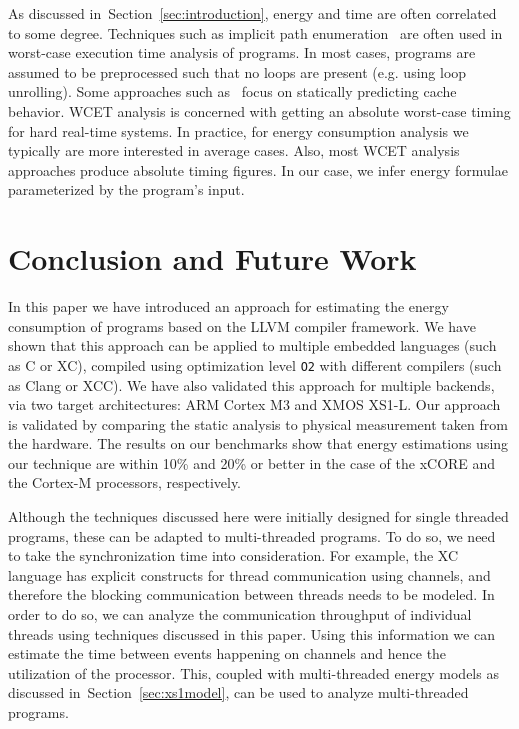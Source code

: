\documentclass[9pt,preprint]{sigplanconf}
\newcommand{\secref}[1]{Section~\ref{sec:#1}}
\begin{document}
As discussed in~\secref{introduction}, energy and time are often correlated to
some degree. Techniques such as implicit path
enumeration~\cite{DBLP:conf/lctrts/LiM95} are often used in worst-case
execution time analysis of programs. In most cases, programs are assumed to be
preprocessed such that no loops are present (e.g. using loop unrolling). Some
approaches such as~\cite{DBLP:conf/vmcai/2009} focus on statically
predicting cache behavior. WCET analysis is concerned with getting an absolute
worst-case timing for hard real-time systems. In practice, for energy
consumption analysis we typically are more interested in average cases. Also,
most WCET analysis approaches produce absolute timing figures. In our case, we
infer energy formulae parameterized by the program's input.

\section{Conclusion and Future Work}
\label{sec:conc_future}
In this paper we have introduced an approach for estimating the energy
consumption of programs based on the LLVM compiler framework. We have shown
that this approach can be applied to multiple embedded languages (such as C or
XC), compiled using optimization level \texttt{O2} with different compilers
(such as Clang or XCC). We have also validated this approach for multiple
backends, via two target architectures: ARM Cortex M3 and XMOS XS1-L. Our
approach is validated by comparing the static analysis to physical measurement
taken from the hardware. The results on our benchmarks show that energy
estimations using our technique are within 10\% and 20\% or better in the case
of the xCORE and the Cortex-M processors, respectively.

Although the techniques discussed here were initially designed for single
threaded programs, these can be adapted to multi-threaded programs. To do so,
we need to take the synchronization time into consideration. For
example, the XC language has explicit constructs for thread communication using
channels, and
therefore the blocking communication between threads needs to be modeled. In
order to do so, we can analyze the communication throughput of individual
threads using techniques discussed in this paper. Using this information we can
estimate the time between events happening on channels and hence the utilization
of the processor. This, coupled with multi-threaded energy models as discussed
in~\secref{xs1model}, can be used to analyze multi-threaded programs.
\end{document}
